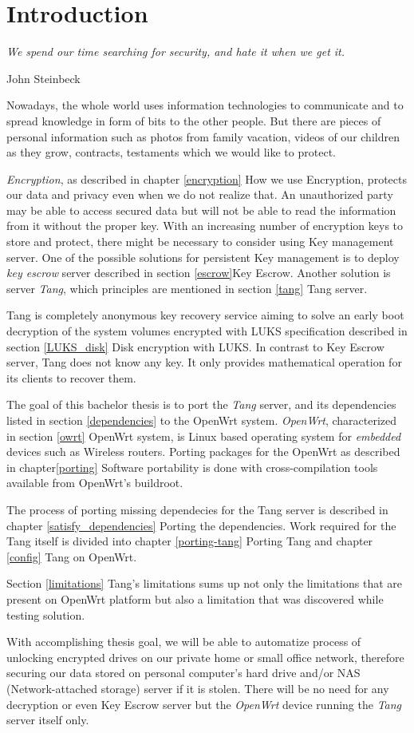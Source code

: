 \chapter{Introduction}\label{introduction}
\epigraph{\it We spend our time searching for security, and hate it when we get it.}{{John Steinbeck}\cite{quote}}

Nowadays, the whole world uses information technologies to communicate and to spread knowledge in form of bits to the other people.
But there are pieces of personal information such as photos from family vacation, videos of our children as they grow, contracts, testaments which we would like to protect.

{\it Encryption}, as described in chapter \ref{encryption} How we use Encryption, protects our data and privacy even when we do not realize that.
An unauthorized party may be able to access secured data but will not be able to read the information from it without the proper key.
With an increasing number of encryption keys to store and protect, there might be necessary to consider using Key management server.
One of the possible solutions for persistent Key management is to deploy {\it key escrow} server described in section \ref{escrow}Key Escrow.
Another solution is server {\it Tang}, which principles are mentioned in section \ref{tang} Tang server.

Tang is completely anonymous key recovery service aiming to solve an early boot decryption of the system volumes encrypted with LUKS specification described in section \ref{LUKS_disk} Disk encryption with LUKS.
In contrast to Key Escrow server, Tang does not know any key.
It only provides mathematical operation for its clients to recover them.

The goal of this bachelor thesis is to port the {\it Tang} server, and its dependencies listed in section \ref{dependencies} to the OpenWrt system.
{\it OpenWrt}, characterized in section \ref{owrt} OpenWrt system, is Linux based operating system for {\it embedded} devices such as Wireless routers.
Porting packages for the OpenWrt as described in chapter\ref{porting} Software portability is done with cross-compilation tools available from OpenWrt's buildroot.

The process of porting missing dependecies for the Tang server is described in chapter \ref{satisfy_dependencies} Porting the dependencies.
Work required for the Tang itself is divided into chapter \ref{porting-tang} Porting Tang and chapter \ref{config} Tang on OpenWrt.

Section \ref{limitations} Tang's limitations sums up not only the limitations that are present on OpenWrt platform but also a limitation that was discovered while testing solution.

With accomplishing thesis goal, we will be able to automatize process of unlocking encrypted drives on our private home or small office network, therefore securing our data stored on personal computer's hard drive and/or NAS (Network-attached storage) server if it is stolen.
There will be no need for any decryption or even Key Escrow server but the {\it OpenWrt} device running the {\it Tang} server itself only.
